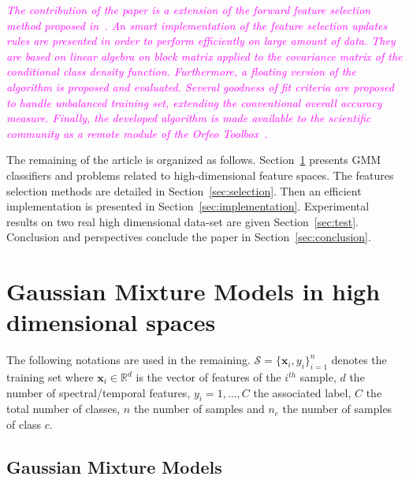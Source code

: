 \documentclass[journal,10pt]{IEEEtran}
\newcommand{\rev}[1]{\textcolor{magenta}{\emph{#1}}}
\begin{document}
\rev{The contribution of the paper is a extension of the forward feature selection method proposed in~\cite{fauvel2015fast}. An smart implementation of the feature selection updates rules are presented in order to perform efficiently on large amount of data. They are based on linear algebra on block matrix applied to the covariance matrix of the conditional class density function.  Furthermore, a floating version of the algorithm is proposed and evaluated. Several \emph{goodness of fit} criteria are proposed to handle unbalanced training set, extending the conventional \emph{overall accuracy} measure.  Finally, the developed algorithm is made available to the scientific community as a remote module of the Orfeo Toolbox~\cite{christophe2008orfeo}.}


The     remaining    of     the     article     is    organized     as
follows.   Section~\ref{sec:gmm-hd}  presents   GMM  classifiers   and
problems  related to  high-dimensional  feature  spaces. The  features
selection methods are detailed in Section~\ref{sec:selection}. Then an
efficient         implementation        is         presented        in
Section~\ref{sec:implementation}.  Experimental  results on  two  real
high dimensional data-set are given Section~\ref{sec:test}. Conclusion
and perspectives conclude the paper in Section~\ref{sec:conclusion}.

\section{Gaussian Mixture Models in high dimensional spaces}
\label{sec:gmm-hd}

The    following    notations    are   used    in    the    remaining.
$\mathcal{S}  = \{\mathbf{x}_i,y_i\}_{i=1}^{n}$  denotes the  training
set where $\mathbf{x}_i \in \mathbb{R}^d$ is the vector of features of
the  $i^{th}$ sample,  $d$  the number  of spectral/temporal  features,
$y_i = 1,...,C$ the associated label, $C$ the total number of classes,
$n$ the  number of samples  and $n_c$ the  number of samples  of class
$c$.

    \subsection{Gaussian Mixture Models}
\end{document}
